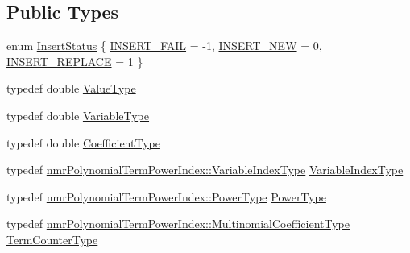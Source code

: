 \subsection*{Public Types}
\begin{DoxyCompactItemize}
\item 
enum \hyperlink{classnmr_polynomial_base_ac3b6b28653104ea70419279a35580940}{Insert\+Status} \{ \hyperlink{classnmr_polynomial_base_ac3b6b28653104ea70419279a35580940a399009f07c3207e22453068ca75a92c5}{I\+N\+S\+E\+R\+T\+\_\+\+F\+A\+I\+L} = -\/1, 
\hyperlink{classnmr_polynomial_base_ac3b6b28653104ea70419279a35580940a7116e8d3bb336fbcc733770bc625c92a}{I\+N\+S\+E\+R\+T\+\_\+\+N\+E\+W} = 0, 
\hyperlink{classnmr_polynomial_base_ac3b6b28653104ea70419279a35580940ab0f22a9f164b43cf7fd1585a0f522ed2}{I\+N\+S\+E\+R\+T\+\_\+\+R\+E\+P\+L\+A\+C\+E} = 1
 \}
\item 
typedef double \hyperlink{classnmr_polynomial_base_a72f0bc16b225e4708bcf15a77ba206e3}{Value\+Type}
\item 
typedef double \hyperlink{classnmr_polynomial_base_a666e909572cf22856c965d47f243a633}{Variable\+Type}
\item 
typedef double \hyperlink{classnmr_polynomial_base_a8693efdfc8585ccb49abea69f74f3eef}{Coefficient\+Type}
\item 
typedef \hyperlink{classnmr_polynomial_term_power_index_ac982d5f82c3a95968e92d54c92cbc3e0}{nmr\+Polynomial\+Term\+Power\+Index\+::\+Variable\+Index\+Type} \hyperlink{classnmr_polynomial_base_aae95477e451ddc7d3ee3f41cbdaadde2}{Variable\+Index\+Type}
\item 
typedef \hyperlink{classnmr_polynomial_term_power_index_a2eec01c3a2c3f56f47982ceffd8e36ed}{nmr\+Polynomial\+Term\+Power\+Index\+::\+Power\+Type} \hyperlink{classnmr_polynomial_base_a58607c884bf2e6725a77ed4d9e14ba26}{Power\+Type}
\item 
typedef \hyperlink{classnmr_polynomial_term_power_index_a09f482da776cfb829e26ad1fb381ab94}{nmr\+Polynomial\+Term\+Power\+Index\+::\+Multinomial\+Coefficient\+Type} \hyperlink{classnmr_polynomial_base_a4b0abd66b12b6f5bfb30d0eb1607e661}{Term\+Counter\+Type}
\end{DoxyCompactItemize}
